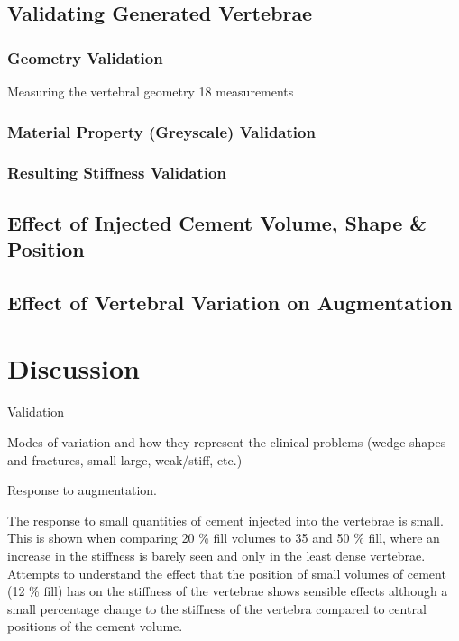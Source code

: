\subsection{Validating Generated Vertebrae}

\subsubsection{Geometry Validation}

Measuring the vertebral geometry 18 measurements

\subsubsection{Material Property (Greyscale) Validation}

\subsubsection{Resulting Stiffness Validation}


\subsection{Effect of Injected Cement Volume, Shape \& Position}



\subsection{Effect of Vertebral Variation on Augmentation}

\section{Discussion}
\label{pca_disc}

Validation

Modes of variation and how they represent the clinical problems (wedge shapes and fractures, small large, weak/stiff, etc.)

Response to augmentation.

The response to small quantities of cement injected into the vertebrae is small. This is shown when comparing 20 \% fill volumes to 35 and 50 \% fill, where an increase in the stiffness is barely seen and only in the least dense vertebrae.
Attempts to understand the effect that the position of small volumes of cement (12 \% fill) has on the stiffness of the vertebrae shows sensible effects although a small percentage change to the stiffness of the vertebra compared to central positions of the cement volume.



